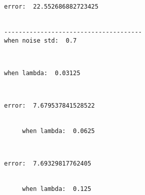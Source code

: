 \documentclass[11pt]{article}
\begin{document}
    \begin{Verbatim}[commandchars=\\\{\}]
     error:  22.552686882723425


--------------------------------------
when noise std:  0.7

    \end{Verbatim}

    \begin{center}
    \end{center}
    { \hspace*{\fill} \\}
    
    \begin{Verbatim}[commandchars=\\\{\}]
     when lambda:  0.03125

    \end{Verbatim}

    \begin{center}
    \end{center}
    { \hspace*{\fill} \\}
    
    \begin{Verbatim}[commandchars=\\\{\}]
     error:  7.679537841528522


     when lambda:  0.0625

    \end{Verbatim}

    \begin{center}
    \end{center}
    { \hspace*{\fill} \\}
    
    \begin{Verbatim}[commandchars=\\\{\}]
     error:  7.69329817762405


     when lambda:  0.125

    \end{Verbatim}

    \begin{center}
    \end{center}
    { \hspace*{\fill} \\}
    
\end{document}
